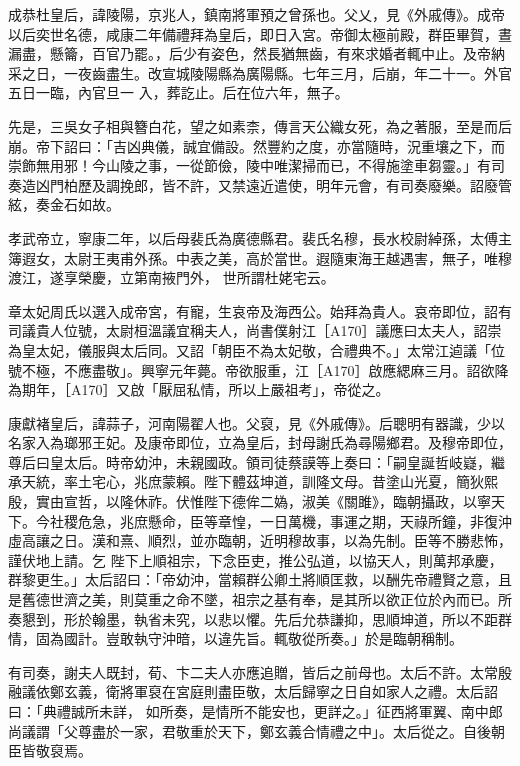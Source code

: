 \begin{pinyinscope}
 成恭杜皇后，諱陵陽，京兆人，鎮南將軍預之曾孫也。父乂，見《外戚傳》。成帝以后奕世名德，咸康二年備禮拜為皇后，即日入宮。帝御太極前殿，群臣畢賀，晝漏盡，懸籥，百官乃罷。，后少有姿色，然長猶無齒，有來求婚者輒中止。及帝納采之日，一夜齒盡生。改宣城陵陽縣為廣陽縣。七年三月，后崩，年二十一。外官五日一臨，內官旦一
 入，葬訖止。后在位六年，無子。



 先是，三吳女子相與簪白花，望之如素柰，傳言天公織女死，為之著服，至是而后崩。帝下詔曰：「吉凶典儀，誠宜備設。然豐約之度，亦當隨時，況重壤之下，而崇飾無用邪！今山陵之事，一從節儉，陵中唯潔掃而已，不得施塗車芻靈。」有司奏造凶門柏歷及調挽郎，皆不許，又禁遠近遣使，明年元會，有司奏廢樂。詔廢管絃，奏金石如故。



 孝武帝立，寧康二年，以后母裴氏為廣德縣君。裴氏名穆，長水校尉綽孫，太傅主簿遐女，太尉王夷甫外孫。中表之美，高於當世。遐隨東海王越遇害，無子，唯穆渡江，遂享榮慶，立第南掖門外，
 世所謂杜姥宅云。



 章太妃周氏以選入成帝宮，有寵，生哀帝及海西公。始拜為貴人。哀帝即位，詔有司議貴人位號，太尉桓溫議宜稱夫人，尚書僕射江［A170］議應曰太夫人，詔崇為皇太妃，儀服與太后同。又詔「朝臣不為太妃敬，合禮典不。」太常江逌議「位號不極，不應盡敬」。興寧元年薨。帝欲服重，江［A170］啟應緦麻三月。詔欲降為期年，［A170］又啟「厭屈私情，所以上嚴祖考」，帝從之。



 康獻褚皇后，諱蒜子，河南陽翟人也。父裒，見《外戚傳》。后聰明有器識，少以名家入為瑯邪王妃。及康帝即位，立為皇后，封母謝氏為尋陽鄉君。及穆帝即位，尊后曰皇太后。時帝幼沖，未親國政。領司徒蔡謨等上奏曰：「嗣皇誕哲岐嶷，繼承天統，率土宅心，兆庶蒙賴。陛下體茲坤道，訓隆文母。昔塗山光夏，簡狄熙殷，實由宣哲，以隆休祚。伏惟陛下德侔二媯，淑美《關雎》，臨朝攝政，以寧天下。今社稷危急，兆庶懸命，臣等章惶，一日萬機，事運之期，天祿所鐘，非復沖虛高讓之日。漢和熹、順烈，並亦臨朝，近明穆故事，以為先制。臣等不勝悲怖，謹伏地上請。乞
 陛下上順祖宗，下念臣吏，推公弘道，以協天人，則萬邦承慶，群黎更生。」太后詔曰：「帝幼沖，當賴群公卿土將順匡救，以酬先帝禮賢之意，且是舊德世濟之美，則莫重之命不墜，祖宗之基有奉，是其所以欲正位於內而已。所奏懇到，形於翰墨，執省未究，以悲以懼。先后允恭謙抑，思順坤道，所以不距群情，固為國計。豈敢執守沖暗，以違先旨。輒敬從所奏。」於是臨朝稱制。



 有司奏，謝夫人既封，荀、卞二夫人亦應追贈，皆后之前母也。太后不許。太常殷融議依鄭玄義，衛將軍裒在宮庭則盡臣敬，太后歸寧之日自如家人之禮。太后詔曰：「典禮誠所未詳，
 如所奏，是情所不能安也，更詳之。」征西將軍翼、南中郎尚議謂「父尊盡於一家，君敬重於天下，鄭玄義合情禮之中」。太后從之。自後朝臣皆敬裒焉。




\end{pinyinscope}

